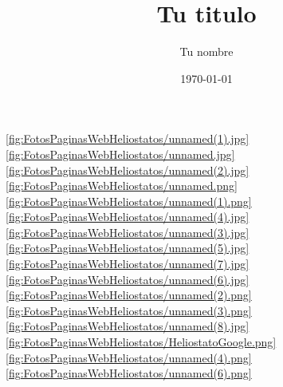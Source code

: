 \documentclass[12pt]{article}
\title{Tu titulo}					%
\author{Tu nombre}					%
\date{\today}						%
\begin{document}
\tableofcontents
\pagebreak









\ref{fig:FotosPaginasWebHeliostatos/unnamed(1).jpg}
\ref{fig:FotosPaginasWebHeliostatos/unnamed.jpg}
\ref{fig:FotosPaginasWebHeliostatos/unnamed(2).jpg}
\ref{fig:FotosPaginasWebHeliostatos/unnamed.png}
\ref{fig:FotosPaginasWebHeliostatos/unnamed(1).png}
\ref{fig:FotosPaginasWebHeliostatos/unnamed(4).jpg}
\ref{fig:FotosPaginasWebHeliostatos/unnamed(3).jpg}
\ref{fig:FotosPaginasWebHeliostatos/unnamed(5).jpg}
\ref{fig:FotosPaginasWebHeliostatos/unnamed(7).jpg}
\ref{fig:FotosPaginasWebHeliostatos/unnamed(6).jpg}
\ref{fig:FotosPaginasWebHeliostatos/unnamed(2).png}
\ref{fig:FotosPaginasWebHeliostatos/unnamed(3).png}
\ref{fig:FotosPaginasWebHeliostatos/unnamed(8).jpg}
\ref{fig:FotosPaginasWebHeliostatos/HeliostatoGoogle.png}
\ref{fig:FotosPaginasWebHeliostatos/unnamed(4).png}
\ref{fig:FotosPaginasWebHeliostatos/unnamed(6).png}
\end{document}
